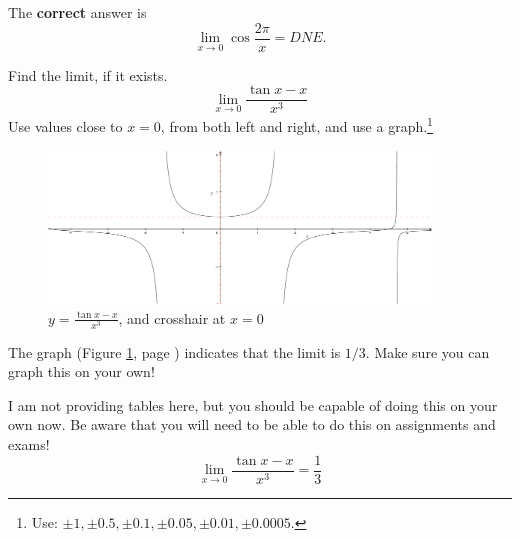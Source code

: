\documentclass[12pt,addpoints, answers, fleqn]{exam}
\begin{document}
\begin{questions}
\begin{solution}
The \textbf{correct} answer is
\[
\mathop {\lim }\limits_{x \to 0 }  \cos \frac{2 \pi}{x} = DNE.
\]
\end{solution}







\question Find the limit, if it exists.
\[
\mathop {\lim }\limits_{x \to 0 } \frac{\tan x - x}{x^3}
\]
Use values close to $x=0$, from both left and right, and use a graph.\footnote{Use: $\pm 1,\pm 0.5,\pm 0.1,\pm 0.05,\pm 0.01, \pm 0.0005$.}
\begin{figure}[htbp] %
   \centering
   \includegraphics[width=4in]{./graphics/graph020107.pdf} 
   \caption{$\displaystyle y = \frac{\tan x - x}{x^3}$, and crosshair at $x=0$}
   \label{fig:graph020107}
\end{figure}
\begin{solution}
The graph (Figure \ref{fig:graph020107}, page \pageref{fig:graph020107}) indicates that the limit is $1/3$. Make sure you can graph this on your own!


I am not providing tables here, but you should be capable of doing this on your own now. Be aware that you will need to be able to do this on assignments and exams!
\[
\mathop {\lim }\limits_{x \to 0 } \frac{\tan x - x}{x^3} =\frac{1}{3}
\]
\end{solution}





\end{questions}
\end{document}
